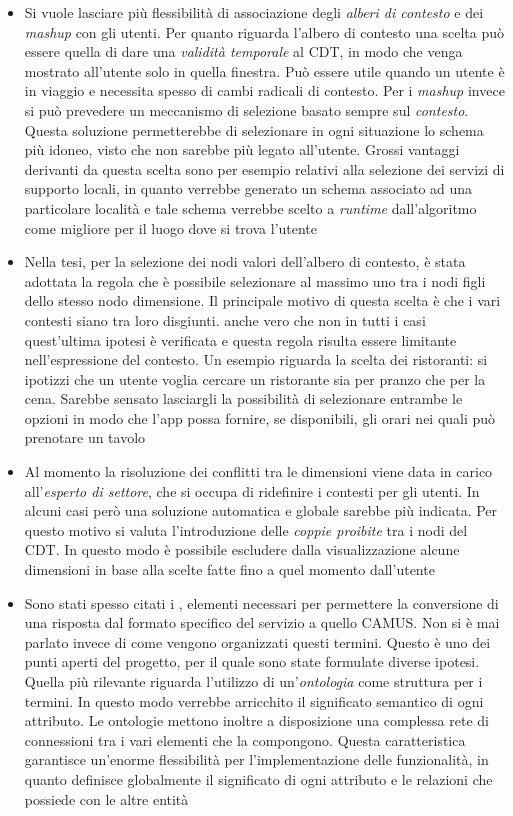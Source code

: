 \begin{itemize}
	\item
	Si vuole lasciare più flessibilità di associazione degli \emph{alberi di contesto} e dei \emph{mashup} con gli utenti. Per quanto riguarda l'albero di contesto una scelta può essere quella di dare una \emph{validità temporale} al CDT, in modo che venga mostrato all'utente solo in quella finestra. Può essere utile quando un utente è in viaggio e necessita spesso di cambi radicali di contesto. Per i \emph{mashup} invece si può prevedere un meccanismo di selezione basato sempre sul \emph{contesto}. Questa soluzione permetterebbe di selezionare in ogni situazione lo schema più idoneo, visto che non sarebbe più legato all'utente. Grossi vantaggi derivanti da questa scelta sono per esempio relativi alla selezione dei servizi di supporto locali, in quanto verrebbe generato un schema associato ad una particolare località e tale schema verrebbe scelto a \emph{runtime} dall'algoritmo come migliore per il luogo dove si trova l'utente
	\item
	Nella tesi, per la selezione dei nodi valori dell'albero di contesto, è stata adottata la regola che è possibile selezionare al massimo uno tra i nodi figli dello stesso nodo dimensione. Il principale motivo di questa scelta è che i vari contesti siano tra loro disgiunti. \upe anche vero che non in tutti i casi quest'ultima ipotesi è verificata e questa regola risulta essere limitante nell'espressione del contesto. Un esempio riguarda la scelta dei ristoranti: si ipotizzi che un utente voglia cercare un ristorante sia per pranzo che per la cena. Sarebbe sensato lasciargli la possibilità di selezionare entrambe le opzioni in modo che l'app possa fornire, se disponibili, gli orari nei quali può prenotare un tavolo
	\item 
	Al momento la risoluzione dei conflitti tra le dimensioni viene data in carico all'\emph{esperto di settore}, che si occupa di ridefinire i contesti per gli utenti. In alcuni casi però una soluzione automatica e globale sarebbe più indicata. Per questo motivo si valuta l'introduzione delle \emph{coppie proibite} tra i nodi del CDT. In questo modo è possibile escludere dalla visualizzazione alcune dimensioni in base alla scelte fatte fino a quel momento dall'utente
	\item
	Sono stati spesso citati i , elementi necessari per permettere la conversione di una risposta dal formato specifico del servizio a quello CAMUS. Non si è mai parlato invece di come vengono organizzati questi termini. Questo è uno dei punti aperti del progetto, per il quale sono state formulate diverse ipotesi. Quella più rilevante riguarda l'utilizzo di un'\emph{ontologia} come struttura per i termini. In questo modo verrebbe arricchito il significato semantico di ogni attributo. Le ontologie mettono inoltre a disposizione una complessa rete di connessioni tra i vari elementi che la compongono. Questa caratteristica garantisce un'enorme flessibilità per l'implementazione delle funzionalità, in quanto definisce globalmente il significato di ogni attributo e le relazioni che possiede con le altre entità

\end{itemize}
